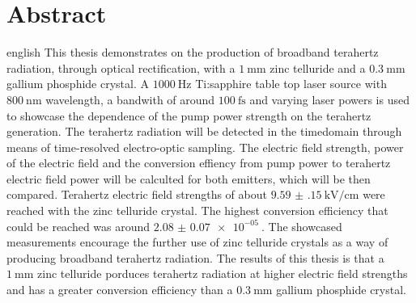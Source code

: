 \thispagestyle{plain}

\section*{Abstract}
\begin{foreignlanguage}{english}
This thesis demonstrates on the production of broadband terahertz radiation, through optical rectification, with a $\SI{1}{\milli\meter}$ zinc telluride and a $\SI{0.3}{\milli\meter}$ gallium phosphide crystal.
A $\SI{1000}{\hertz}$ Ti:sapphire table top laser source with $\SI{800}{\nano\meter}$ wavelength, a bandwith of around $\SI{100}{\femto\second}$ and varying laser powers is used to showcase the dependence of the pump power strength on the terahertz generation.
The terahertz radiation will be detected in the timedomain through means of time-resolved electro-optic sampling.
The electric field strength, power of the electric field and the conversion effiency from pump power to terahertz electric field power will be calculted for both emitters, which will be then compared.
Terahertz electric field strengths of about $\SI{9.59(15)}{\kilo\V\per\centi\meter}$ were reached with the zinc telluride crystal.
The highest conversion efficiency that could be reached was around $\SI{2.08(7)e-05}{}$.
The showcased measurements encourage the further use of zinc telluride crystals as a way of producing broadband terahertz radiation.
The results of this thesis is that a $\SI{1}{\milli\meter}$ zinc telluride porduces terahertz radiation at higher electric field strengths and has a greater conversion efficiency than a $\SI{0.3}{\milli\meter}$ gallium phosphide crystal. 
\end{foreignlanguage}
